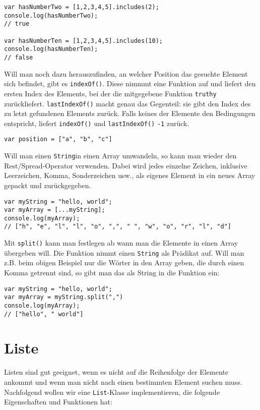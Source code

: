 \documentclass[babel]{book}
\begin{document}
\begin{lstlisting}[caption=Array Konstruktor]
var hasNumberTwo = [1,2,3,4,5].includes(2);
console.log(hasNumberTwo);
// true

var hasNumberTen = [1,2,3,4,5].includes(10);
console.log(hasNumberTen);
// false
\end{lstlisting}

Will man noch dazu herauszufinden, an welcher Position das gesuchte Element sich befindet, gibt es \lstinline|indexOf()|. Diese nimmmt eine Funktion auf und liefert den ersten Index des Elements, bei der die mitgegebene Funktion \lstinline|truthy| zurückliefert. \lstinline|lastIndexOf()| macht genau das Gegenteil: sie gibt den Index des zu letzt gefundenen Elements zurück. Falls keines der Elemente den Bedingungen entspricht, liefert \lstinline|indexOf()| und \lstinline|lastIndexOf()| \lstinline|-1| zurück.

\begin{lstlisting}[caption=Array Konstruktor]
var position = ["a", "b", "c"]
\end{lstlisting}

Will man einen \lstinline|String|in einen Array umwandeln, so kann man wieder den Rest/Spread-Operator verwenden. Dabei wird jedes einzelne Zeichen, inklusive Leerzeichen, Komma, Sonderzeichen usw., als eigenes Element in ein neues Array gepackt und zurückgegeben.

\begin{lstlisting}[caption=Array Konstruktor]
var myString = "hello, world";
var myArray = [...myString];
console.log(myArray);
// ["h", "e", "l", "l", "o", ",", " ", "w", "o", "r", "l", "d"]
\end{lstlisting}

Mit \lstinline|split()| kann man festlegen ab wann man die Elemente in einen Array übergeben will. Die Funktion nimmt einen \lstinline|String| als Prädikat auf. Will man z.B. beim obigen Beispiel nur die Wörter in den Array geben, die durch einen Komma getrennt sind, so gibt man das als String in die Funktion ein:
\begin{lstlisting}[caption=Array Konstruktor]
var myString = "hello, world";
var myArray = myString.split(",")
console.log(myArray);
// ["hello", " world"]
\end{lstlisting}

\section{Liste}
Listen sind gut geeignet, wenn es nicht auf die Reihenfolge der Elemente ankommt und wenn man nicht nach einen bestimmten Element suchen muss. Nachfolgend wollen wir eine \lstinline|List|-Klasse implementieren, die folgende Eigenschaften und Funktionen hat:
\end{document}
